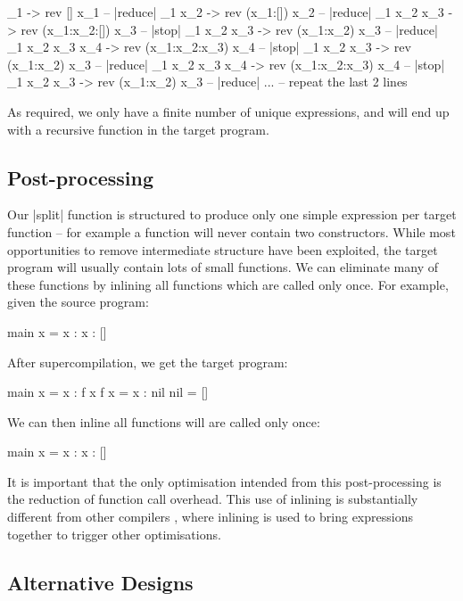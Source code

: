 \documentclass[draft]{sigplanconf}
\begin{document}
\begin{code}
\x_1 -> rev [] x_1                          -- |reduce|
\x_1 x_2 -> rev (x_1:[]) x_2                -- |reduce|
\x_1 x_2 x_3 -> rev (x_1:x_2:[]) x_3        -- |stop|
\x_1 x_2 x_3 -> rev (x_1:x_2) x_3           -- |reduce|
\x_1 x_2 x_3 x_4 -> rev (x_1:x_2:x_3) x_4   -- |stop|
\x_1 x_2 x_3 -> rev (x_1:x_2) x_3           -- |reduce|
\x_1 x_2 x_3 x_4 -> rev (x_1:x_2:x_3) x_4   -- |stop|
\x_1 x_2 x_3 -> rev (x_1:x_2) x_3           -- |reduce|
... -- repeat the last 2 lines
\end{code}

As required, we only have a finite number of unique expressions, and will end up with a recursive function in the target program.

\subsection{Post-processing}
\label{sec:postprocess}

Our |split| function is structured to produce only one simple expression per target function -- for example a function will never contain two constructors. While most opportunities to remove intermediate structure have been exploited, the target program will usually contain lots of small functions. We can eliminate many of these functions by inlining all functions which are called only once. For example, given the source program:

\begin{code}
main x = x : x : []
\end{code}

After supercompilation, we get the target program:

\begin{code}
main x = x : f x
f x = x : nil
nil = []
\end{code}

We can then inline all functions will are called only once:

\begin{code}
main x = x : x : []
\end{code}

It is important that the only optimisation intended from this post-processing is the reduction of function call overhead. This use of inlining is substantially different from other compilers \cite{spj:inlining}, where inlining is used to bring expressions together to trigger other optimisations.

\subsection{Alternative Designs}
\label{sec:extensions}
\end{document}
